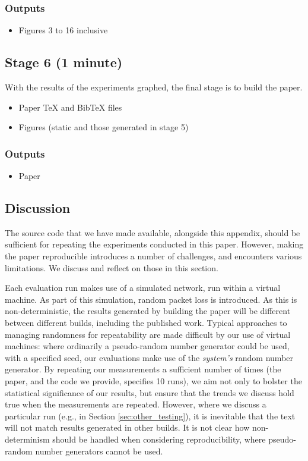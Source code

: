 \documentclass[sigconf]{acmart}
\begin{document}
\subsubsection*{Outputs}

\begin{itemize}
\item Figures 3 to 16 inclusive
\end{itemize}

\subsection*{Stage 6 (1 minute)}
With the results of the experiments graphed, the final stage is to build the paper.

\begin{itemize}
\item Paper TeX and BibTeX files
\item Figures (static and those generated in stage 5)
\end{itemize}
\subsubsection*{Outputs}
\begin{itemize}
\item Paper
\end{itemize}

\subsection*{Discussion}

The source code that we have made available, alongside this appendix, should be sufficient
for repeating the experiments conducted in this paper. However, making the paper
reproducible introduces a number of challenges, and encounters various limitations. We
discuss and reflect on those in this section.

Each evaluation run makes use of a simulated network, run within a virtual machine. As
part of this simulation, random packet loss is introduced. As this is non-deterministic,
the results generated by building the paper will be different between different builds,
including the published work. Typical approaches to managing randomness for repeatability
are made difficult by our use of virtual machines: where ordinarily a pseudo-random
number generator could be used, with a specified seed, our evaluations make use of the
\emph{system's} random number generator. By repeating our measurements a sufficient
number of times (the paper, and the code we provide, specifies 10 runs), we aim not only
to bolster the statistical significance of our results, but ensure that the trends we
discuss hold true when the measurements are repeated. However, where we discuss a
particular run (e.g., in Section \ref{sec:other_testing}), it is inevitable that the text
will not match results generated in other builds. It is not clear how non-determinism
should be handled when considering reproducibility, where pseudo-random number generators
cannot be used.
\end{document}
